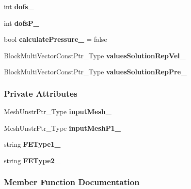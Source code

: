 \begin{DoxyCompactItemize}
int {\bfseries dofs\+\_\+}
\item 
\mbox{\label{classFEDD_1_1ErrorEstimation_a0c642b8ce3bd9fc44d991a5c179d8ffb}} 
int {\bfseries dofs\+P\+\_\+}
\item 
\mbox{\label{classFEDD_1_1ErrorEstimation_a93268eb31aa3e675ef71615b59f505e4}} 
bool {\bfseries calculate\+Pressure\+\_\+} = false
\item 
\mbox{\label{classFEDD_1_1ErrorEstimation_a4ff8b4ffba65abb6275028c0aaba0bd7}} 
Block\+Multi\+Vector\+Const\+Ptr\+\_\+\+Type {\bfseries values\+Solution\+Rep\+Vel\+\_\+}
\item 
\mbox{\label{classFEDD_1_1ErrorEstimation_a82b50f80d70253a74c1eee9655f994f5}} 
Block\+Multi\+Vector\+Const\+Ptr\+\_\+\+Type {\bfseries values\+Solution\+Rep\+Pre\+\_\+}
\end{DoxyCompactItemize}
\subsubsection*{Private Attributes}
\begin{DoxyCompactItemize}
\item 
\mbox{\label{classFEDD_1_1ErrorEstimation_a947a384175d98b2a6f064c1f57081e29}} 
Mesh\+Unstr\+Ptr\+\_\+\+Type {\bfseries input\+Mesh\+\_\+}
\item 
\mbox{\label{classFEDD_1_1ErrorEstimation_a90c33276bcf41ed2a921df17167c8a46}} 
Mesh\+Unstr\+Ptr\+\_\+\+Type {\bfseries input\+Mesh\+P1\+\_\+}
\item 
\mbox{\label{classFEDD_1_1ErrorEstimation_a57d325582be58d2efcdd996e4cabb2ce}} 
string {\bfseries F\+E\+Type1\+\_\+}
\item 
\mbox{\label{classFEDD_1_1ErrorEstimation_a28cc586b6ee293e677b46fb8dce23c09}} 
string {\bfseries F\+E\+Type2\+\_\+}
\end{DoxyCompactItemize}


\subsubsection{Member Function Documentation}
\mbox{\label{classFEDD_1_1ErrorEstimation_aafc01a284c3fae0212ba65d224c328f0}} 
